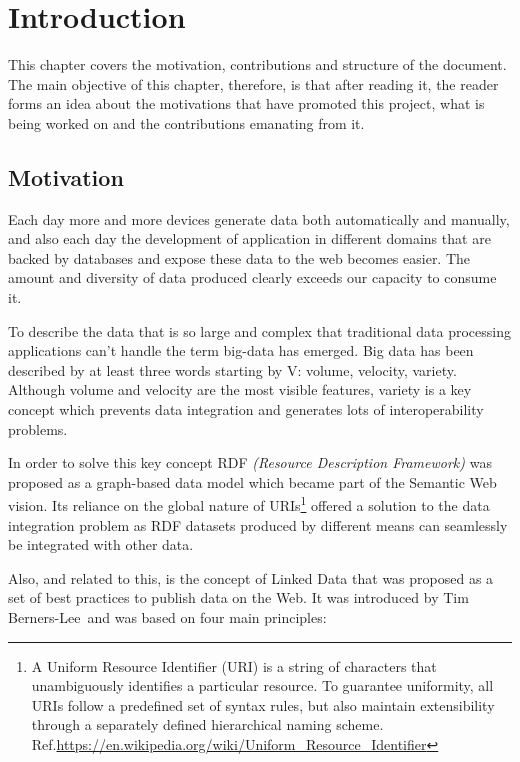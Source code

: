 \chapter{Introduction}
\label{ch:intro}

This chapter covers the motivation, contributions and structure of the document.
The main objective of this chapter, therefore, is that after reading it, the reader
forms an idea about the motivations that have promoted this project, what is
being worked on and the contributions emanating from it.


\section{Motivation}
\label{sec:intro-motiv}

Each day more and more devices generate data both automatically and manually, and also each day the development of
application in different domains that are backed by databases and expose these data to the web becomes easier. The
amount and diversity of data produced clearly exceeds our capacity to consume it.

To describe the data that is so large and complex that traditional data processing applications can’t handle the
term big-data \cite{big-data,sagiroglu2013big} has emerged. Big data has been described by at least three words starting
by V: volume, velocity, variety. Although volume and velocity are the most visible features, variety is a key concept
which prevents data integration and generates lots of interoperability problems.

In order to solve this key concept RDF \textit{(Resource Description Framework)} was proposed as a graph-based data model
\cite{graph-data-model} which became part of the Semantic Web \cite{semantic-web} vision.
Its reliance on the global nature of URIs\footnote{A Uniform Resource Identifier (URI) is a string of
characters that unambiguously identifies a particular resource. To guarantee uniformity, all URIs follow a predefined
set of syntax rules, but also maintain extensibility through a separately defined hierarchical naming scheme.
Ref.\url{https://en.wikipedia.org/wiki/Uniform_Resource_Identifier}} offered a solution to the data integration
problem as RDF datasets produced by different means can seamlessly be integrated with other data.

Also, and related to this, is the concept of Linked Data \cite{linked-data} that was proposed as a set of best
practices to publish data on the Web. It was introduced by Tim Berners-Lee and was based on four main principles:

